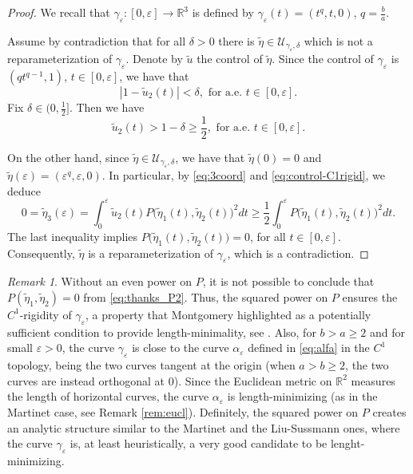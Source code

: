 \documentclass[12pt]{amsart}
\theoremstyle{plain}
\theoremstyle{definition}
\theoremstyle{remark}
\newtheorem{remark}[theorem]{Remark}
\numberwithin{equation}{section}
\newcommand{\R}{\mathbb{R}}
\newcommand{\<}{\langle}
\renewcommand{\>}{\rangle}
\newcommand{\e}{\varepsilon}
\newcommand{\0}{\theta}
\renewcommand{\a}{\alpha}
\newcommand{\g}{\gamma}
\newcommand{\de}{\delta}
\newcommand{\1}{{-1}}
\renewcommand{\=}{\coloneqq}
\renewcommand{\.}{\dots}
\renewcommand{\-}{\cdot}
\renewcommand{\:}{\,:\,}
\newcommand{\mc}{\mathcal}
\theoremstyle{definition}
\begin{document}
\begin{proof}
	We recall that $\g_\e:[0,\e]\to \R^3$ is defined by $\g_\e(t)=(t^q,t,0)$, $q=\frac ba$.
	
	Assume by contradiction that for all $\de>0$ there is $\tilde\eta\in\mc U_{\g_\e,\de}$ which is not a reparameterization of $\g_\e$. Denote by $\tilde u$ the control of $\tilde\eta$. Since the control of $\g_\e$ is $(qt^{q-1},1)$, $t\in[0,\e]$, we have that
	\begin{equation}
		|1-\tilde u_2(t)|<\de, \text{ for a.e. } t\in[0,\e].
	\end{equation}
	Fix $\de\in(0,\frac12]$. Then we have
	\begin{equation}
		\label{eq:control-C1rigid}
		\tilde u_2(t)>1-\de\geq \frac12, \text{ for a.e. } t\in[0,\e].
	\end{equation}
	
	On the other hand, since $\tilde \eta\in\mc U_{\g_\e,\de}$, we have that $\tilde\eta(0)=0$ and $\tilde\eta(\e)=(\e^q,\e,0)$. In particular, by \eqref{eq:3coord} and \eqref{eq:control-C1rigid}, we deduce
	\begin{equation}
		\label{eq:thanks_P2}
		0=\tilde\eta_3(\e)=\int_0^\e \tilde u_2(t) P\big(\tilde \eta_1(t),\tilde \eta_2(t)\big)^2dt\geq \frac12 \int_0^\e P\big(\tilde \eta_1(t),\tilde \eta_2(t)\big)^2dt.
	\end{equation}
	The last inequality implies $P\big(\tilde\eta_1(t),\tilde \eta_2(t)\big)=0$, for all $t\in[0,\e]$. Consequently, $\tilde\eta$ is a reparameterization of $\g_\e$, which is a contradiction.
\end{proof}



\begin{remark}
	\label{rem:P^2_2}
	Without an even power on $P$, it is not possible to conclude that $P(\tilde\eta_1,\tilde\eta_2)=0$ from \eqref{eq:thanks_P2}. Thus, the squared power on $P$ ensures the $C^1$-rigidity of $\g_\e$, a property that Montgomery highlighted as a potentially sufficient condition to provide length-minimality, see \cite[Chapter 3]{Mon02}. 
	Also, for $b>a\geq2$ and for small $\e>0$, the curve $\g_\e$ is close to the curve $\a_\e$ defined in \eqref{eq:alfa} in the $C^1$ topology, being the two curves tangent at the origin (when $a>b\geq2$, the two curves are instead orthogonal at 0). Since the Euclidean metric on $\R^2$ measures the length of horizontal curves, the curve $\a_\e$ is length-minimizing (as in the Martinet case, see Remark \ref{rem:eucl}). Definitely, the squared power on $P$ creates an analytic structure similar to the Martinet and the Liu-Sussmann ones, where the curve $\g_\e$ is, at least heuristically, a very good candidate to be lenght-minimizing.
\end{remark}
\end{document}
